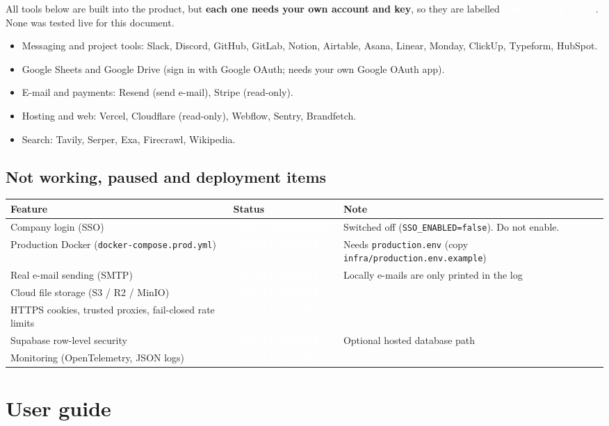 \documentclass[11pt,a4paper]{article}
\newcommand{\sSetup}{\colorbox{setupc}{\textcolor{white}{\scriptsize\bfseries\ NEEDS\ SETUP\ }}}
\newcommand{\sPaused}{\colorbox{pausedc}{\textcolor{white}{\scriptsize\bfseries\ NOT\ WORKING\ }}}
\newcommand{\sDeploy}{\colorbox{deployc}{\textcolor{white}{\scriptsize\bfseries\ DEPLOYMENT\ }}}
\newcommand{\env}[1]{\texttt{#1}}
\begin{document}
All tools below are built into the product, but \textbf{each one needs your own
account and key}, so they are labelled \sSetup. None was tested live for this
document.

\begin{itemize}[nosep]
  \item Messaging and project tools: Slack, Discord, GitHub, GitLab, Notion, Airtable, Asana, Linear, Monday, ClickUp, Typeform, HubSpot.
  \item Google Sheets and Google Drive (sign in with Google OAuth; needs your own Google OAuth app).
  \item E-mail and payments: Resend (send e-mail), Stripe (read-only).
  \item Hosting and web: Vercel, Cloudflare (read-only), Webflow, Sentry, Brandfetch.
  \item Search: Tavily, Serper, Exa, Firecrawl, Wikipedia.
\end{itemize}

\subsection{Not working, paused and deployment items}

\begin{longtable}{@{}L{4.6cm}L{2.6cm}L{8.4cm}@{}}
\toprule
\textbf{Feature} & \textbf{Status} & \textbf{Note} \\
\midrule
\endhead
Company login (SSO) & \sPaused & Switched off (\env{SSO\_ENABLED=false}). Do not enable. \\
Production Docker (\texttt{docker-compose.prod.yml}) & \sDeploy & Needs \texttt{production.env} (copy \texttt{infra/production.env.example}) \\
Real e-mail sending (SMTP) & \sDeploy & Locally e-mails are only printed in the log \\
Cloud file storage (S3 / R2 / MinIO) & \sDeploy & \\
HTTPS cookies, trusted proxies, fail-closed rate limits & \sDeploy & \\
Supabase row-level security & \sDeploy & Optional hosted database path \\
Monitoring (OpenTelemetry, JSON logs) & \sDeploy & \\
\bottomrule
\end{longtable}

\section{User guide}
\end{document}
